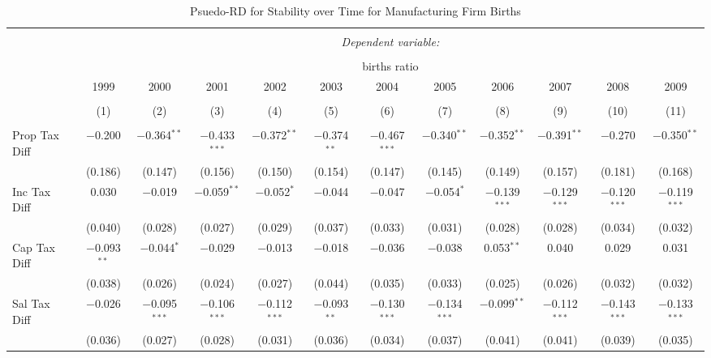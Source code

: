 
\begin{table}[!htbp] \centering 
  \caption{Psuedo-RD for Stability over Time for  Manufacturing Firm Births} 
  \label{31-33year} 
\small 
\begin{tabular}{@{\extracolsep{5pt}}lccccccccccc} 
\\[-1.8ex]\hline 
\hline \\[-1.8ex] 
 & \multicolumn{11}{c}{\textit{Dependent variable:}} \\ 
\cline{2-12} 
\\[-1.8ex] & \multicolumn{11}{c}{births ratio} \\ 
 & 1999 & 2000 & 2001 & 2002 & 2003 & 2004 & 2005 & 2006 & 2007 & 2008 & 2009 \\ 
\\[-1.8ex] & (1) & (2) & (3) & (4) & (5) & (6) & (7) & (8) & (9) & (10) & (11)\\ 
\hline \\[-1.8ex] 
 Prop Tax Diff & $-$0.200 & $-$0.364$^{**}$ & $-$0.433$^{***}$ & $-$0.372$^{**}$ & $-$0.374$^{**}$ & $-$0.467$^{***}$ & $-$0.340$^{**}$ & $-$0.352$^{**}$ & $-$0.391$^{**}$ & $-$0.270 & $-$0.350$^{**}$ \\ 
  & (0.186) & (0.147) & (0.156) & (0.150) & (0.154) & (0.147) & (0.145) & (0.149) & (0.157) & (0.181) & (0.168) \\ 
  Inc Tax Diff & 0.030 & $-$0.019 & $-$0.059$^{**}$ & $-$0.052$^{*}$ & $-$0.044 & $-$0.047 & $-$0.054$^{*}$ & $-$0.139$^{***}$ & $-$0.129$^{***}$ & $-$0.120$^{***}$ & $-$0.119$^{***}$ \\ 
  & (0.040) & (0.028) & (0.027) & (0.029) & (0.037) & (0.033) & (0.031) & (0.028) & (0.028) & (0.034) & (0.032) \\ 
  Cap Tax Diff & $-$0.093$^{**}$ & $-$0.044$^{*}$ & $-$0.029 & $-$0.013 & $-$0.018 & $-$0.036 & $-$0.038 & 0.053$^{**}$ & 0.040 & 0.029 & 0.031 \\ 
  & (0.038) & (0.026) & (0.024) & (0.027) & (0.044) & (0.035) & (0.033) & (0.025) & (0.026) & (0.032) & (0.032) \\ 
  Sal Tax Diff & $-$0.026 & $-$0.095$^{***}$ & $-$0.106$^{***}$ & $-$0.112$^{***}$ & $-$0.093$^{**}$ & $-$0.130$^{***}$ & $-$0.134$^{***}$ & $-$0.099$^{**}$ & $-$0.112$^{***}$ & $-$0.143$^{***}$ & $-$0.133$^{***}$ \\ 
  & (0.036) & (0.027) & (0.028) & (0.031) & (0.036) & (0.034) & (0.037) & (0.041) & (0.041) & (0.039) & (0.035) \\ 

\end{tabular}
\end{table}
